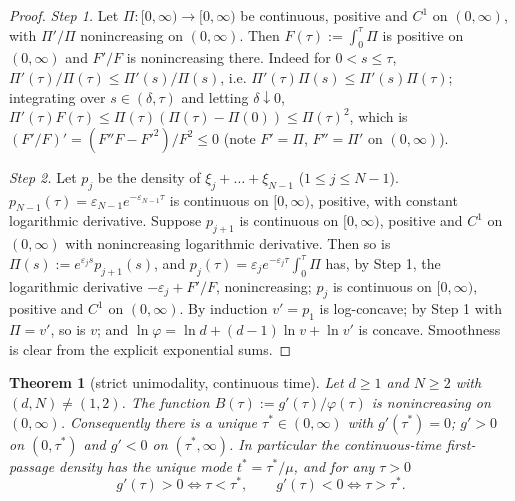 \documentclass[11pt,a4paper]{article}
\newtheorem{theorem}{Theorem}[section]
\theoremstyle{definition}
\theoremstyle{remark}
\begin{document}
\begin{proof}
\emph{Step 1.} Let $\Pi:[0,\infty)\to[0,\infty)$ be continuous, positive and $C^1$ on $(0,\infty)$, with $\Pi'/\Pi$ nonincreasing on $(0,\infty)$. Then $F(\tau):=\int_0^\tau\Pi$ is positive on $(0,\infty)$ and $F'/F$ is nonincreasing there. Indeed for $0<s\le\tau$, $\Pi'(\tau)/\Pi(\tau)\le\Pi'(s)/\Pi(s)$, i.e. $\Pi'(\tau)\Pi(s)\le\Pi'(s)\Pi(\tau)$; integrating over $s\in(\delta,\tau)$ and letting $\delta\downarrow0$, $\Pi'(\tau)F(\tau)\le\Pi(\tau)(\Pi(\tau)-\Pi(0))\le\Pi(\tau)^2$, which is $(F'/F)'=(F''F-F'^2)/F^2\le0$ (note $F'=\Pi$, $F''=\Pi'$ on $(0,\infty)$).

\emph{Step 2.} Let $p_j$ be the density of $\xi_j+\dots+\xi_{N-1}$ ($1\le j\le N-1$). $p_{N-1}(\tau)=\varepsilon_{N-1}e^{-\varepsilon_{N-1}\tau}$ is continuous on $[0,\infty)$, positive, with constant logarithmic derivative. Suppose $p_{j+1}$ is continuous on $[0,\infty)$, positive and $C^1$ on $(0,\infty)$ with nonincreasing logarithmic derivative. Then so is $\Pi(s):=e^{\varepsilon_js}p_{j+1}(s)$, and $p_j(\tau)=\varepsilon_je^{-\varepsilon_j\tau}\int_0^\tau\Pi$ has, by Step 1, the logarithmic derivative $-\varepsilon_j+F'/F$, nonincreasing; $p_j$ is continuous on $[0,\infty)$, positive and $C^1$ on $(0,\infty)$. By induction $v'=p_1$ is log-concave; by Step 1 with $\Pi=v'$, so is $v$; and $\ln\varphi=\ln d+(d-1)\ln v+\ln v'$ is concave. Smoothness is clear from the explicit exponential sums.
\end{proof}

\begin{theorem}[{strict unimodality, continuous time}]
Let $d\ge1$ and $N\ge2$ with $(d,N)\ne(1,2)$. The function $B(\tau):=g'(\tau)/\varphi(\tau)$ is nonincreasing on $(0,\infty)$. Consequently there is a unique $\tau^*\in(0,\infty)$ with $g'(\tau^*)=0$; $g'>0$ on $(0,\tau^*)$ and $g'<0$ on $(\tau^*,\infty)$. In particular the continuous-time first-passage density has the unique mode $t^*=\tau^*/\mu$, and for any $\tau>0$
\begin{equation*}
g'(\tau)>0\iff\tau<\tau^*,\qquad g'(\tau)<0\iff\tau>\tau^* .
\end{equation*}
\end{theorem}
\end{document}
